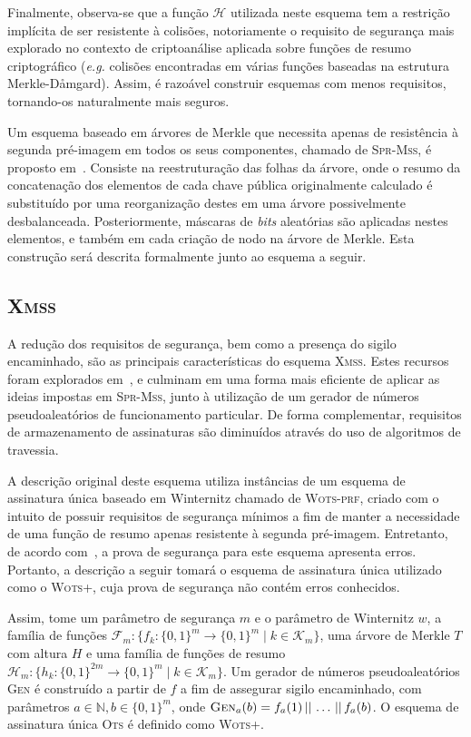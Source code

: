 \documentclass[12pt,notitlepage]{report}
\newcommand{\hh}{\mathcal{H}}
\newcommand{\concat}{\, \vert \vert \,}
\newcommand{\binwds}[1]{\{0, 1\}^{#1}}
\newcommand{\wotsprf}{\textsc{Wots-prf}}
\newcommand{\wotsplus}{\textsc{Wots+}}
\newcommand{\sprmss}{\textsc{Spr-Mss}}
\newcommand{\xmss}{\textsc{Xmss}}
\begin{document}
Finalmente, observa-se que a função $\hh{}$ utilizada neste esquema tem a restrição implícita de ser resistente à colisões, notoriamente o requisito de segurança mais explorado no contexto de criptoanálise aplicada sobre funções de resumo criptográfico (\emph{e.g.} colisões encontradas em várias funções baseadas na estrutura Merkle-D\aa{}mgard). Assim, é razoável construir esquemas com menos requisitos, tornando-os naturalmente mais seguros.

Um esquema baseado em árvores de Merkle que necessita apenas de resistência à segunda pré-imagem em todos os seus componentes, chamado de \sprmss{}, é proposto em~\cite{Dahmen:2008:DSO:1473109.1473117}. Consiste na reestruturação das folhas da árvore, onde o resumo da concatenação dos elementos de cada chave pública originalmente calculado é substituído por uma reorganização destes em uma árvore possivelmente desbalanceada. Posteriormente, máscaras de \emph{bits} aleatórias são aplicadas nestes elementos, e também em cada criação de nodo na árvore de Merkle. Esta construção será descrita formalmente junto ao esquema a seguir.

\subsection{\xmss{}}
\label{subsection:xmss}

A redução dos requisitos de segurança, bem como a presença do sigilo encaminhado, são as principais características do esquema \xmss{}. Estes recursos foram explorados em~\cite{Buchmann:2011:XPF:2184003.2184011}, e culminam em uma forma mais eficiente de aplicar as ideias impostas em \sprmss{}, junto à utilização de um gerador de números pseudoaleatórios de funcionamento particular. De forma complementar, requisitos de armazenamento de assinaturas são diminuídos através do uso de algoritmos de travessia.

A descrição original deste esquema utiliza instâncias de um esquema de assinatura única baseado em Winternitz chamado de \wotsprf{}, criado com o intuito de possuir requisitos de segurança mínimos a fim de manter a necessidade de uma função de resumo apenas resistente à segunda pré-imagem. Entretanto, de acordo com~\cite{LafrancePhilip2017}, a prova de segurança para este esquema apresenta erros. Portanto, a descrição a seguir tomará o esquema de assinatura única utilizado como o \wotsplus{}, cuja prova de segurança não contém erros conhecidos.

Assim, tome um parâmetro de segurança $m$ e o parâmetro de Winternitz $w$, a família de funções $\mathcal{F}_m : \{f_k : \binwds{m} \longrightarrow \binwds{m} \mid k \in
\mathcal{K}_m\}$, uma árvore de Merkle $T$ com altura $H$ e uma família de funções de resumo $\hh{}_m : \{h_k : \binwds{2m} \longrightarrow \binwds{m} \mid k \in
\mathcal{K}_m\}$. Um gerador de números pseudoaleatórios \textsc{Gen} é construído a partir de $f$ a fim de assegurar sigilo encaminhado, com parâmetros $a \in \mathbb{N}, b \in \binwds{m}$, onde $\textsc{Gen}_{a}(b) = f_a(1) \concat \dots \concat f_a(b)$. O esquema de assinatura única \textsc{Ots} é definido como \wotsplus{}.
\end{document}
